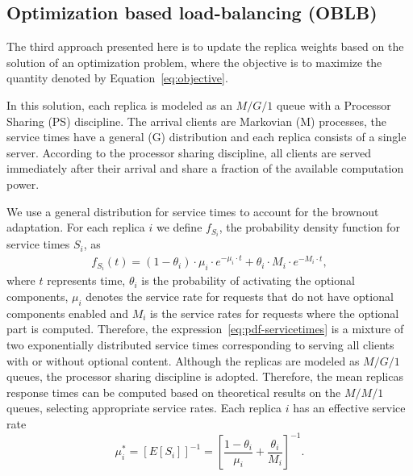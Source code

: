 \subsection{Optimization based load-balancing (OBLB)}

The third approach presented here is to update the replica weights
based on the solution of an optimization problem, where the objective
is to maximize the quantity denoted by Equation~\eqref{eq:objective}.

In this solution, each replica is modeled as an $M/G/1$ queue with a
Processor Sharing (PS) discipline. The arrival clients are Markovian
(M) processes, the service times have a general (G) distribution and
each replica consists of a single server. According to the processor
sharing discipline, all clients are served immediately after their
arrival and share a fraction of the available computation power.

We use a general distribution for service times to account for the
brownout adaptation. For each replica $i$ we define $f_{S_i}$, the
probability density function for service times $S_i$, as
\begin{align}
  f_{S_i} (t) = (1 - \theta_i) \cdot \mu_i \cdot e^{-\mu_i \cdot t} +
  \theta_i \cdot M_i \cdot e^{-M_i \cdot t} ,
\label{eq:pdf-servicetimes}
\end{align}
where $t$ represents time, $\theta_i$ is the probability of activating
the optional components, $\mu_i$ denotes the service rate for requests
that do not have optional components enabled and $M_i$ is the service
rates for requests where the optional part is computed. Therefore, the
expression~\eqref{eq:pdf-servicetimes} is a mixture of two
exponentially distributed service times corresponding to serving all
clients with or without optional content. Although the replicas are
modeled as $M/G/1$ queues, the processor sharing discipline is
adopted. Therefore, the mean replicas response times can be computed
based on theoretical results on the $M/M/1$ queues, selecting
appropriate service rates. Each replica $i$ has an effective service
rate
\begin{equation}
  \mu_i^* = \left[ E[S_i] \right]^{-1} = \left[ \frac{1-\theta_i}{\mu_i}
    + \frac{\theta_i}{M_i} \right]^{-1} .
  \label{eq:effective-service-rate}
\end{equation}

